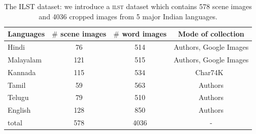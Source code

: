 %
%
%

\begin{table}
\caption{The ILST dataset: we introduce a \textsc{ilst} dataset which contains 578 scene images and 4036 cropped images from 5 major Indian languages.}
\centering
\begin{tabular}{|l|c|c|c|}
\hline

Languages & $\#$ scene images & $\#$ word images & Mode of collection\\
\hline\hline
Hindi & 76 & 514 & Authors, Google Images \\%
\hline
Malayalam & 121 & 515 & Authors, Google Images  \\
\hline
Kannada & 115 & 534 & Char74K~\cite{deCampos09}\\
\hline
Tamil & 59 &563 & Authors \\%
\hline
Telugu & 79 &510 & Authors \\%
\hline
English & 128  & 850 & Authors \\%
\hline
total & 578 & 4036 & -\\
\hline

\end{tabular}
\label{tab:dataset}
\end{table}

